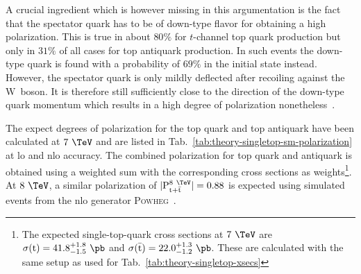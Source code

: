 A crucial ingredient which is however missing in this argumentation is the fact that the spectator quark has to be of down-type flavor for obtaining a high polarization. This is  true in about $80\%$ for $t$-channel top quark production but only in $31\%$ of all cases for top antiquark production. In such events the down-type quark is found with a probability of $69\%$ in the initial state instead. However, the spectator quark is only mildly deflected after recoiling against the $\mathrm{W}$~boson. It is therefore still sufficiently close to the direction of the down-type quark momentum which results in a high degree of polarization nonetheless~\cite{Bernreuther:2008ju}.

The expect degrees of polarization for the top quark and top antiquark have been calculated at $7~\TeV$ and are listed in Tab.~\ref{tab:theory-singletop-sm-polarization} at \gls{lo} and \gls{nlo} accuracy. The combined polarization for top quark and antiquark is obtained using a weighted sum with the corresponding cross sections as weights\footnote{The expected single-top-quark cross sections at $7~\TeV$ are $\sigma(\mathrm{t})=41.8^{+1.8}_{-1.5}~\pb$ and $\sigma(\bar{\mathrm{t}})=22.0^{+1.3}_{-1.2}~\pb$. These are calculated with the same setup as used for Tab.~\ref{tab:theory-singletop-xsecs}}. At $8~\TeV$, a similar polarization of $|\mathrm{P}_{\mathrm{t}+\bar{\mathrm{t}}}^\mathrm{8~\TeV}|=0.88$ is expected using simulated events from the \gls{nlo} generator \textsc{Powheg}~\cite{Khachatryan:2015dzz}.


